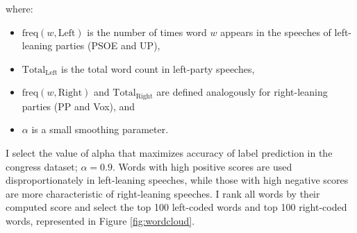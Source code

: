 \documentclass[12pt]{article}
\begin{document}
where:
\begin{itemize}
	\item $\mathrm{freq}(w,\text{Left})$ is the number of times word $w$ appears in the speeches of left-leaning parties (PSOE and UP),
	\item $\mathrm{Total}_{\text{Left}}$ is the total word count in left-party speeches,
	\item $\mathrm{freq}(w,\text{Right})$ and $\mathrm{Total}_{\text{Right}}$ are defined analogously for right-leaning parties (PP and Vox), and
	\item $\alpha$ is a small smoothing parameter.
	
\end{itemize}

I select the value of alpha that maximizes accuracy of label prediction in the congress dataset; $\alpha=0.9$.	
Words with high positive scores are used disproportionately in left-leaning speeches, while those with high negative scores are more characteristic of right-leaning speeches. I rank all words by their computed score and select the top 100 left-coded words and top 100 right-coded words, represented in  Figure  \ref{fig:wordcloud}. 
\end{document}

